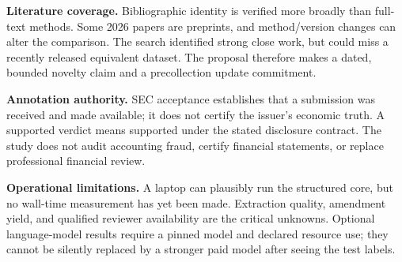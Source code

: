 \documentclass[11pt,a4paper]{article}
\newcommand{\pbreak}{\clearpage}
\newcommand{\lead}[1]{\textbf{\color{navy}#1}}
\begin{document}
\lead{Literature coverage.} Bibliographic identity is verified more broadly than full-text methods. Some 2026 papers are preprints, and method/version changes can alter the comparison. The search identified strong close work, but could miss a recently released equivalent dataset. The proposal therefore makes a dated, bounded novelty claim and a precollection update commitment.

\lead{Annotation authority.} SEC acceptance establishes that a submission was received and made available; it does not certify the issuer's economic truth. A supported verdict means supported under the stated disclosure contract. The study does not audit accounting fraud, certify financial statements, or replace professional financial review.

\lead{Operational limitations.} A laptop can plausibly run the structured core, but no wall-time measurement has yet been made. Extraction quality, amendment yield, and qualified reviewer availability are the critical unknowns. Optional language-model results require a pinned model and declared resource use; they cannot be silently replaced by a stronger paid model after seeing the test labels.

\pbreak
\end{document}
